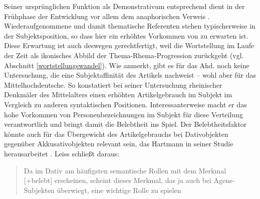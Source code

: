 Seiner ursprünglichen Funktion als Demonstrativum entsprechend dient  in der Frühphase der Entwicklung vor allem dem anaphorischen Verweis \parencite[s. u.a.][]{Jager1917,Oubouzar1992,Leiss2000}. Wiederaufgenommene und damit thematische Referenten stehen typischerweise in der Subjektsposition, so dass hier ein erhöhtes Vorkommen von  zu erwarten ist. Diese Erwartung ist auch deswegen gerechtfertigt, weil die Wortstellung im Laufe der Zeit als ikonisches Abbild der Thema-Rhema-Progression zurückgeht (vgl. Abschnitt \ref{wortstellungswandel}). Wie  \textcite[165]{Leiss2000} anmerkt, gibt es für das Ahd. noch keine Untersuchung, die eine Subjektaffinität des Artikels nachweist -- wohl aber für das Mittelhochdeutsche. So konstatiert \textcite[33ff.]{Hartmann1967} bei seiner Untersuchung rheinischer Denkmäler des Mittelalters einen erhöhten Artikelgebrauch im Subjekt im Vergleich zu anderen syntaktischen Positionen. Interessanterweise macht er das hohe Vorkommen von Personenbezeichnungen im Subjekt für diese Verteilung verantwortlich und bringt damit die Belebtheit ins Spiel. Der Belebtheitsfaktor könnte auch für das Übergewicht des Artikelgebrauchs bei Dativobjekten gegenüber Akkusativobjekten relevant sein, das Hartmann in seiner Studie herausarbeitet \parencite[42f.]{Hartmann1967}. Leiss schließt daraus: \blockcquote[165]{Leiss2000}{Da im Dativ am häufigsten semantische Rollen mit dem Merkmal [+belebt] erscheinen,
scheint dieses Merkmal, das ja auch bei Agens-Subjekten überwiegt, eine
wichtige Rolle zu spielen}. 

